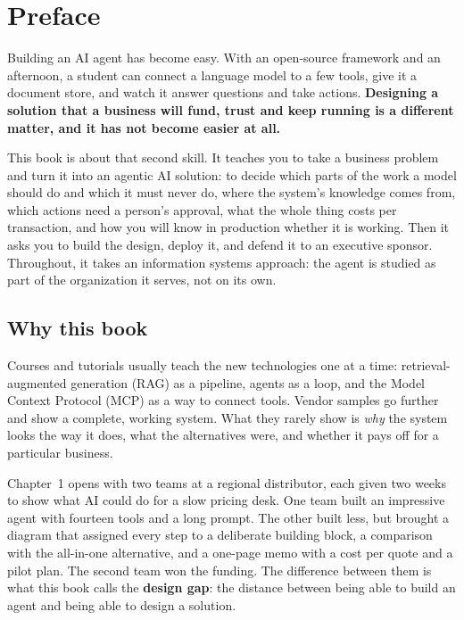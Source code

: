 
\chapter*{Preface}

Building an AI agent has become easy. With an open-source framework and an afternoon, a student can connect a language model to a few tools, give it a document store, and watch it answer questions and take actions. \textbf{Designing a solution that a business will fund, trust and keep running is a different matter, and it has not become easier at all.}

This book is about that second skill. It teaches you to take a business problem and turn it into an agentic AI solution: to decide which parts of the work a model should do and which it must never do, where the system's knowledge comes from, which actions need a person's approval, what the whole thing costs per transaction, and how you will know in production whether it is working. Then it asks you to build the design, deploy it, and defend it to an executive sponsor. Throughout, it takes an information systems approach: the agent is studied as part of the organization it serves, not on its own.

\section*{Why this book}

Courses and tutorials usually teach the new technologies one at a time: retrieval-augmented generation (RAG) as a pipeline, agents as a loop, and the Model Context Protocol (MCP) as a way to connect tools. Vendor samples go further and show a complete, working system. What they rarely show is \emph{why} the system looks the way it does, what the alternatives were, and whether it pays off for a particular business.

Chapter~1 opens with two teams at a regional distributor, each given two weeks to show what AI could do for a slow pricing desk. One team built an impressive agent with fourteen tools and a long prompt. The other built less, but brought a diagram that assigned every step to a deliberate building block, a comparison with the all-in-one alternative, and a one-page memo with a cost per quote and a pilot plan. The second team won the funding. The difference between them is what this book calls the \textbf{design gap}: the distance between being able to build an agent and being able to design a solution.

